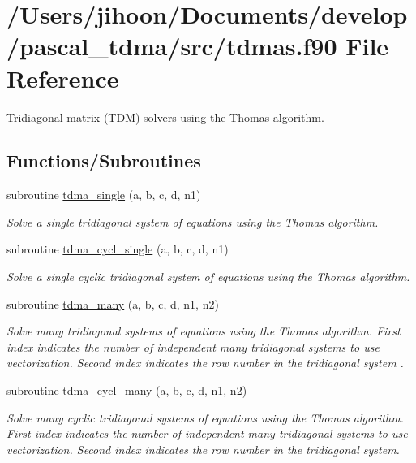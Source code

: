 \hypertarget{tdmas_8f90}{}\section{/\+Users/jihoon/\+Documents/develop/pascal\+\_\+tdma/src/tdmas.f90 File Reference}
\label{tdmas_8f90}


Tridiagonal matrix (T\+DM) solvers using the Thomas algorithm.  


\subsection*{Functions/\+Subroutines}
\begin{DoxyCompactItemize}
\item 
subroutine \mbox{\hyperlink{tdmas_8f90_a4a6130fff49607012fefacc8640424a7}{tdma\+\_\+single}} (a, b, c, d, n1)
\begin{DoxyCompactList}\small\item\em Solve a single tridiagonal system of equations using the Thomas algorithm. \end{DoxyCompactList}\item 
subroutine \mbox{\hyperlink{tdmas_8f90_a4cb1f95e9c608085c5bb19baff639d9e}{tdma\+\_\+cycl\+\_\+single}} (a, b, c, d, n1)
\begin{DoxyCompactList}\small\item\em Solve a single cyclic tridiagonal system of equations using the Thomas algorithm. \end{DoxyCompactList}\item 
subroutine \mbox{\hyperlink{tdmas_8f90_ab8cc761496e63e21ee8379d4fc077f05}{tdma\+\_\+many}} (a, b, c, d, n1, n2)
\begin{DoxyCompactList}\small\item\em Solve many tridiagonal systems of equations using the Thomas algorithm. First index indicates the number of independent many tridiagonal systems to use vectorization. Second index indicates the row number in the tridiagonal system . \end{DoxyCompactList}\item 
subroutine \mbox{\hyperlink{tdmas_8f90_a6c50d548eaa4b5e9b96ccbf8f65cb12a}{tdma\+\_\+cycl\+\_\+many}} (a, b, c, d, n1, n2)
\begin{DoxyCompactList}\small\item\em Solve many cyclic tridiagonal systems of equations using the Thomas algorithm. First index indicates the number of independent many tridiagonal systems to use vectorization. Second index indicates the row number in the tridiagonal system. \end{DoxyCompactList}\end{DoxyCompactItemize}


